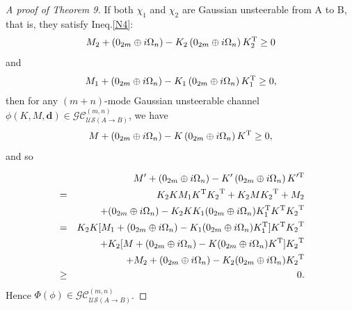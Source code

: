 \documentclass[10pt,aps,pra,amsfonts,amssymb,amsmath,%
floatfix,nofootinbib, groupedaddress,superscriptaddress,citesort,twocolumn
]{revtex4}%
\begin{document}
\begin{proof}[A proof of Theorem 9]
If both $\chi_1$ and  $\chi_2$ are Gaussian unsteerable from A to B, that is, they satisfy Ineq.\eqref{N4}:
\begin{eqnarray*}\label{N7}
	M_2 + \left( 0_{2m} \oplus i\Omega _n \right) - K_2\left(0_{2m} \oplus i\Omega _n \right){K_2^{\rm T}} \ge 0
\end{eqnarray*}	and
\begin{eqnarray*}\label{N72}
	M_1 + \left( 0_{2m} \oplus i\Omega _n \right) - K_1\left(0_{2m} \oplus i\Omega _n \right){K_1^{\rm T}} \ge 0,
\end{eqnarray*}	
then for any  $(m+n)$-mode Gaussian unsteerable channel $\phi( {K, M,\mathbf d})\in {\mathcal {GC}}^{(m,n)}_{\mathcal {US}(A \rightarrow B)} $, we have 
\begin{eqnarray*}\label{N72}
	M+ \left( 0_{2m} \oplus i\Omega _n \right) - K\left(0_{2m} \oplus i\Omega _n \right){K^{\rm T}} \ge 0,
\end{eqnarray*}	and so 

\begin{eqnarray*}\label{N9}
	& &M' + ({0_{2m}} \oplus i{\Omega _n}) -K'\left( {0_{2m}} \oplus i{\Omega _n} \right){K'^{\rm T}} \\
	&=& {K_2}K{M_1}{K^{\rm T}}{K_2}^{\rm T} + {K_2}M{K_2}^{\rm T} + {M_2}\\
	&& +({0_{2m}} \oplus i{\Omega _n})-K_2{K}K_1 (0_{2m} \oplus i{\Omega _n})K_1^{\rm T}K^{\rm T} {{ K_2}^{\rm T}}	\\
	&=&  {K_2}K[M_1+({0_{2m}} \oplus i{\Omega _n})-K_1 (0_{2m} \oplus i{\Omega _n})K_1^{\rm T}]K^{\rm T}{K_2}^{\rm T}\\
	&& + {K_2}[M+({0_{2m}} \oplus i{\Omega _n})-K (0_{2m} \oplus i{\Omega _n})K^{\rm T}]{K_2}^{\rm T} \\
	&&+{M_2}+({0_{2m}} \oplus i{\Omega _n})-K_2 (0_{2m} \oplus i{\Omega _n}) {{ K_2}^{\rm T}}\\
	&\ge&  0.
\end{eqnarray*}
Hence  $ \Phi \left( \phi  \right)\in {\mathcal {GC}}^{(m,n)}_{\mathcal {US}(A \rightarrow B)} $.



\end{proof}
\end{document}
